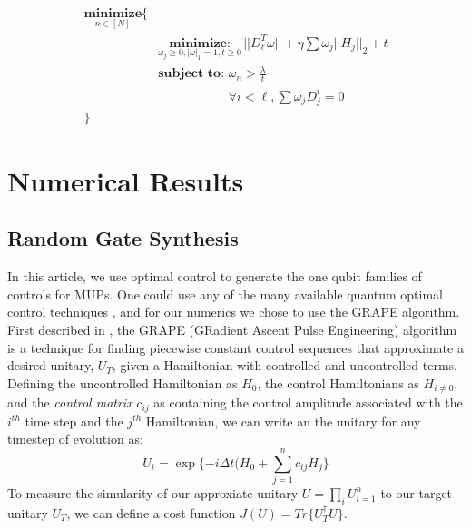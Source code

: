 \documentclass[aps,nofootinbib,pra,notitlepage,twocolumn]{revtex4-1}
\begin{document}
\begin{equation}\label{eq:minimization_regularization}
\begin{split}
\underset{n\in[N]}{\textbf{minimize}}\{\\
    &\underset{\omega_j\geq0, |\omega|_1=1, t\geq0}{\textbf{minimize}: } ||D_{\ell}^T\omega||+ \eta\sum\omega_j||H_j||_2 + t\\
&\textbf{subject to: } \omega_n > \frac{\lambda}{t}\\
&\phantom{\textbf{subject to: }} \forall i<\ell, \sum \omega_jD_j^i=0\\
\}
\end{split}
\end{equation}

\section{Numerical Results}
\label{sec:numerical_results}
\subsection{Random Gate Synthesis}
\label{sec:random_gate_synthesis}
 In this article, we use optimal control to generate the one qubit families of controls for MUPs. One could use any of the many available quantum optimal control techniques \cite{Khaneja2005, Caneva2011, Machnes2018}, and for our numerics we chose to use the GRAPE algorithm. First described in \cite{Khaneja2005}, the GRAPE (GRadient Ascent Pulse Engineering) algorithm is a technique for finding piecewise constant control sequences that approximate a desired unitary, $U_T$, given a Hamiltonian with controlled and uncontrolled terms. Defining the uncontrolled Hamiltonian as $H_0$, the control Hamiltonians as $H_{i\neq 0}$, and the \textit{control matrix} $c_{ij}$ as containing the control amplitude associated with the $i^{th}$ time step and the $j^{th}$ Hamiltonian, we can write an the unitary for any timestep of evolution as:
\begin{equation}\label{eq:3}
  U_i = \exp\{-i\Delta t(H_0 + \sum_{j=1}^{n}c_{ij}H_{j}\}
\end{equation}
To measure the simularity of our approxiate unitary $U=\prod_iU_{i=1}^n$ to our target unitary $U_T$, we can define a cost function $J(U) = Tr\{U_T^{\dagger}U\}$.
\end{document}
